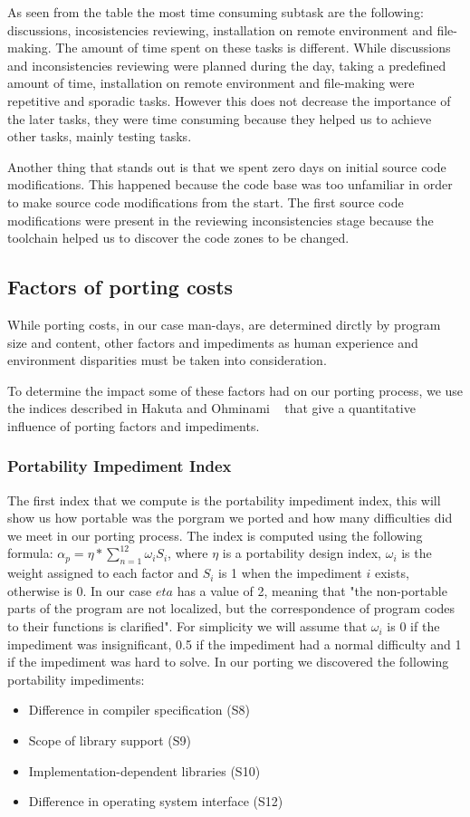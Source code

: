 As seen from the table the most time consuming subtask are the following:
discussions, incosistencies reviewing, installation on remote environment and
file-making. The amount of time spent on these tasks is different. While
discussions and inconsistencies reviewing were planned during the day, taking
a predefined amount of time, installation on remote environment and file-making
were repetitive and sporadic tasks. However this does not decrease the
importance of the later tasks, they were time consuming because they helped us
to achieve other tasks, mainly testing tasks.

Another thing that stands out is that we spent zero days on initial source code
modifications. This happened because the code base was too unfamiliar in order
to make source code modifications from the start. The first source code
modifications were present in the reviewing inconsistencies stage because the
toolchain helped us to discover the code zones to be changed.

\subsection{Factors of porting costs}

While porting costs, in our case man-days, are determined dirctly by program size and
content, other factors and impediments as human experience and environment
disparities must be taken into consideration.

To determine the impact some of these factors had on our porting process, we
use the indices described in Hakuta and Ohminami ~\cite{b2} that give
a quantitative influence of porting factors and impediments.

\subsubsection{Portability Impediment Index}

The first index that we compute is the portability impediment index, this will
show us how portable was the porgram we ported and how many difficulties did
we meet in our porting process. The index is computed using the following
formula: $\alpha_p = \eta * \sum_{n=1}^{12} \omega_i S_i$, where $\eta$ is a
portability design index, $\omega_i$ is the weight assigned to each factor and
$S_i$ is 1 when the impediment $i$ exists, otherwise is 0. In our case $eta$
has a value of 2, meaning that "the non-portable parts of the program are not
localized, but the correspondence of program codes to their functions is
clarified". For simplicity we will assume that $\omega_i$ is 0 if the impediment
was insignificant, 0.5 if the impediment had a normal difficulty and 1 if the
impediment was hard to solve. In our porting we discovered the following
portability impediments:
\begin{itemize}
    \item Difference in compiler specification (S8)
    \item Scope of library support (S9)
    \item Implementation-dependent libraries (S10)
    \item Difference in operating system interface (S12)
\end{itemize}

